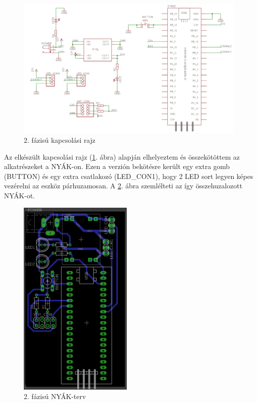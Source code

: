 \documentclass[../main.tex]{subfiles}
\begin{document}
        \begin{figure}[h!]
            \centering
                \includegraphics[width=15cm]{resources/pcb_res/schematic_v01.png}
            \caption{2. fázisú kapcsolási rajz}
            \label{fig:schematic_v01}
        \end{figure}
        
        Az elkészült kapcsolási rajz (\ref{fig:schematic_v01}. ábra) alapján elhelyeztem és összekötöttem az alkatrészeket a NYÁK-on. Ezen a verzión bekötésre került egy extra gomb (BUTTON) és egy extra csatlakozó (LED\_CON1), hogy 2 LED sort legyen képes vezérelni az eszköz párhuzamosan. A \ref{fig:board_v01}. ábra szemlélteti az így összehuzalozott NYÁK-ot.
        
        \begin{figure}[h!]
            \centering
                \includegraphics[width=5.5cm, angle =-90]{resources/pcb_res/board_v01.png}
            \caption{2. fázisú NYÁK-terv}
            \label{fig:board_v01}
        \end{figure}
        
\end{document}
